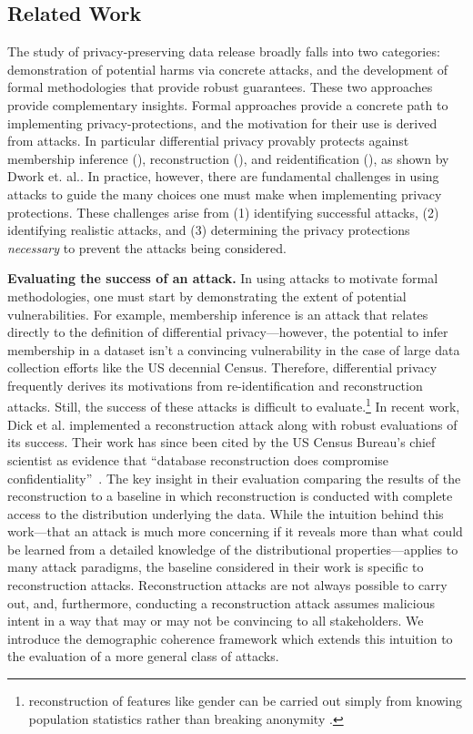 \subsection{Related Work}

The study of privacy-preserving data release broadly falls into two categories: demonstration of potential harms via concrete attacks, and the development of formal methodologies that provide robust guarantees. These two approaches provide complementary insights. Formal approaches provide a concrete path to implementing privacy-protections, and the motivation for their use is derived from attacks. In particular differential privacy provably protects against membership inference (\eg \cite{Homer08, DworkSSUV15, ShokriSSS17,YeomGFJ18}), reconstruction (\eg \cite{DinurN03, CohenN20a, C:HaiNukYog22, carlini2021private}), and reidentification (\eg \cite{sweeney, NarayananS08}), as shown by Dwork et. al.\cite{DworkSSU17}. In practice, however, there are fundamental challenges in using attacks to guide the many choices one must make when implementing privacy protections. These challenges arise from (1) identifying successful attacks, (2) identifying realistic attacks, and  (3) determining the privacy protections \emph{necessary} to prevent the attacks being considered.

\medskip\noindent
\textbf{Evaluating the success of an attack.} In using attacks to motivate formal methodologies, one must start by demonstrating the extent of potential vulnerabilities. For example, membership inference is an attack that relates directly to the definition of differential privacy---however, the potential to infer membership in a dataset isn't a convincing vulnerability in the case of large data collection efforts like the US decennial Census. Therefore, differential privacy frequently derives its motivations from re-identification and reconstruction attacks. Still, the success of these attacks is difficult to evaluate.\footnote{\eg reconstruction of features like gender can be carried out simply from knowing population statistics rather than breaking anonymity \cite{ruggles2022role}.}
In recent work, Dick et al. implemented a reconstruction attack \cite{pnas_reconstruction} along with robust evaluations of its success. Their work has since been cited by the US Census Bureau’s chief scientist as evidence that “database reconstruction does compromise confidentiality”~\cite{KellerA24}. The key insight in their evaluation comparing the results of the reconstruction to a baseline in which reconstruction is conducted with complete access to the distribution underlying the data. 
While the intuition behind this work---that an attack is much more concerning if it reveals more than what could be learned from a detailed knowledge of the distributional properties---applies to many attack paradigms, 
the baseline considered in their work is specific to reconstruction attacks.  Reconstruction attacks are not always possible to carry out, and, furthermore, conducting a reconstruction attack assumes malicious intent in a way that may or may not be convincing to all stakeholders. We introduce the demographic coherence framework which extends this intuition to the evaluation of a more general class of attacks. 

